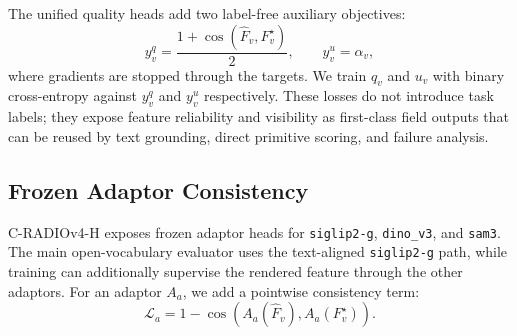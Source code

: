 \documentclass[10pt,twocolumn,letterpaper]{article}
\newcommand{\radio}{C-RADIOv4-H}
\begin{document}
The unified quality heads add two label-free auxiliary objectives:
\begin{equation}
  y^q_v = \frac{1+\cos(\hat{F}_v,F_v^\star)}{2}, \qquad
  y^u_v = \alpha_v,
\end{equation}
where gradients are stopped through the targets. We train $q_v$ and $u_v$ with
binary cross-entropy against $y^q_v$ and $y^u_v$ respectively. These losses do
not introduce task labels; they expose feature reliability and visibility as
first-class field outputs that can be reused by text grounding, direct
primitive scoring, and failure analysis.

\subsection{Frozen Adaptor Consistency}

\radio{} exposes frozen adaptor heads for \texttt{siglip2-g}, \texttt{dino\_v3},
and \texttt{sam3}. The main open-vocabulary evaluator uses the text-aligned
\texttt{siglip2-g} path, while training can additionally supervise the rendered
feature through the other adaptors. For an adaptor $A_a$, we add a pointwise
consistency term:
\begin{equation}
  \mathcal{L}_{a}
  =
  1 - \cos(A_a(\hat{F}_v), A_a(F_v^{\star})).
\end{equation}
\end{document}
